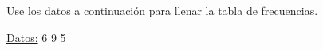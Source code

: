 \documentclass{cdplf-prueba}
\begin{document}
\subsection{}

Use los datos a continuación para llenar la tabla de frecuencias.

\underline{Datos:} \hspace{4pt} 6 \hspace{4pt}\textbullet\hspace{4pt} 9 \hspace{4pt}\textbullet\hspace{4pt} 5 \hspac
\end{document}
